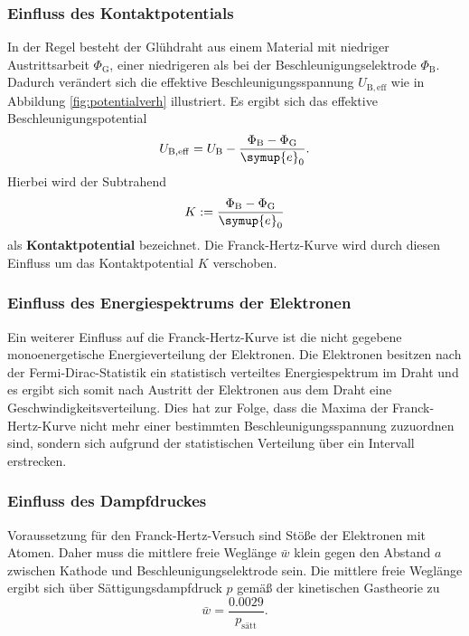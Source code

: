 \subsubsection{Einfluss des Kontaktpotentials}
In der Regel besteht der Glühdraht aus einem Material mit niedriger Austrittsarbeit 
$\Phi_{\mathrm{G}}$, einer niedrigeren als bei der Beschleunigungselektrode $\Phi_{\mathrm{B}}$.
Dadurch verändert sich die effektive Beschleunigungsspannung $U_{\mathrm{B,eff}}$ wie in 
Abbildung \ref{fig:potentialverh} illustriert.
Es ergibt sich das effektive Beschleunigungspotential 
\begin{equation}
	U_{\mathrm{B,eff}} = U_{\mathrm{B}} - \frac{\Phi_{\mathrm{B}}-\Phi_{\mathrm{G}}}{\symup{e}_0} \mathrm{.}
\end{equation}
Hierbei wird der Subtrahend 
\begin{equation}
	K:=\frac{\Phi_{\mathrm{B}}-\Phi_{\mathrm{G}}}{\symup{e}_0} 
\end{equation}
als \textbf{Kontaktpotential} bezeichnet.
Die Franck-Hertz-Kurve wird durch diesen Einfluss um das Kontaktpotential $K$ verschoben.
\subsubsection{Einfluss des Energiespektrums der Elektronen}
Ein weiterer Einfluss auf die Franck-Hertz-Kurve ist die nicht gegebene monoenergetische 
Energieverteilung der Elektronen. Die Elektronen besitzen nach der Fermi-Dirac-Statistik ein
statistisch verteiltes Energiespektrum im Draht und es ergibt sich somit nach Austritt der 
Elektronen aus dem Draht eine Geschwindigkeitsverteilung. Dies hat zur Folge, dass die Maxima
der Franck-Hertz-Kurve nicht mehr einer bestimmten Beschleunigungsspannung zuzuordnen sind, 
sondern sich aufgrund der statistischen Verteilung über ein Intervall erstrecken.
\subsubsection{Einfluss des Dampfdruckes}
Voraussetzung für den Franck-Hertz-Versuch sind Stöße der Elektronen mit Atomen. 
Daher muss die mittlere freie Weglänge $\bar{w}$ klein gegen den Abstand $a$ zwischen Kathode
und Beschleunigungselektrode sein. 
Die mittlere freie Weglänge ergibt sich über Sättigungsdampfdruck $p$ gemäß der kinetischen
Gastheorie zu
\begin{equation}
	\label{eqn:freiewegl}
	\bar{w} = \frac{0.0029}{p_{\mathrm{sätt}}} \mathrm{.}
\end{equation}

